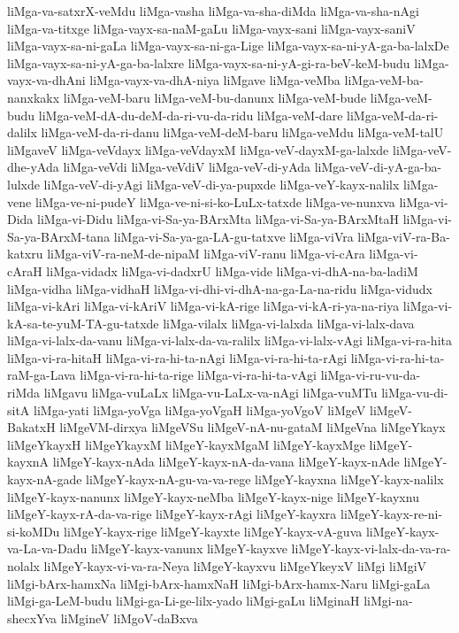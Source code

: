 {liMga-va-satxrX-veMdu
liMga-vasha
liMga-va-sha-diMda
liMga-va-sha-nAgi
liMga-va-titxge
liMga-vayx-sa-naM-gaLu
liMga-vayx-sani
liMga-vayx-saniV
liMga-vayx-sa-ni-gaLa
liMga-vayx-sa-ni-ga-Lige
liMga-vayx-sa-ni-yA-ga-ba-lalxDe
liMga-vayx-sa-ni-yA-ga-ba-lalxre
liMga-vayx-sa-ni-yA-gi-ra-beV-keM-budu
liMga-vayx-va-dhAni
liMga-vayx-va-dhA-niya
liMgave
liMga-veMba
liMga-veM-ba-nanxkakx
liMga-veM-baru
liMga-veM-bu-danunx
liMga-veM-bude
liMga-veM-budu
liMga-veM-dA-du-deM-da-ri-vu-da-ridu
liMga-veM-dare
liMga-veM-da-ri-dalilx
liMga-veM-da-ri-danu
liMga-veM-deM-baru
liMga-veMdu
liMga-veM-talU
liMgaveV
liMga-veVdayx
liMga-veVdayxM
liMga-veV-dayxM-ga-lalxde
liMga-veV-dhe-yAda
liMga-veVdi
liMga-veVdiV
liMga-veV-di-yAda
liMga-veV-di-yA-ga-ba-lulxde
liMga-veV-di-yAgi
liMga-veV-di-ya-pupxde
liMga-veY-kayx-nalilx
liMga-vene
liMga-ve-ni-pudeY
liMga-ve-ni-si-ko-LuLx-tatxde
liMga-ve-nunxva
liMga-vi-Dida
liMga-vi-Didu
liMga-vi-Sa-ya-BArxMta
liMga-vi-Sa-ya-BArxMtaH
liMga-vi-Sa-ya-BArxM-tana
liMga-vi-Sa-ya-ga-LA-gu-tatxve
liMga-viVra
liMga-viV-ra-Ba-katxru
liMga-viV-ra-neM-de-nipaM
liMga-viV-ranu
liMga-vi-cAra
liMga-vi-cAraH
liMga-vidadx
liMga-vi-dadxrU
liMga-vide
liMga-vi-dhA-na-ba-ladiM
liMga-vidha
liMga-vidhaH
liMga-vi-dhi-vi-dhA-na-ga-La-na-ridu
liMga-vidudx
liMga-vi-kAri
liMga-vi-kAriV
liMga-vi-kA-rige
liMga-vi-kA-ri-ya-na-riya
liMga-vi-kA-sa-te-yuM-TA-gu-tatxde
liMga-vilalx
liMga-vi-lalxda
liMga-vi-lalx-dava
liMga-vi-lalx-da-vanu
liMga-vi-lalx-da-va-ralilx
liMga-vi-lalx-vAgi
liMga-vi-ra-hita
liMga-vi-ra-hitaH
liMga-vi-ra-hi-ta-nAgi
liMga-vi-ra-hi-ta-rAgi
liMga-vi-ra-hi-ta-raM-ga-Lava
liMga-vi-ra-hi-ta-rige
liMga-vi-ra-hi-ta-vAgi
liMga-vi-ru-vu-da-riMda
liMgavu
liMga-vuLaLx
liMga-vu-LaLx-va-nAgi
liMga-vuMTu
liMga-vu-di-sitA
liMga-yati
liMga-yoVga
liMga-yoVgaH
liMga-yoVgoV
liMgeV
liMgeV-BakatxH
liMgeVM-dirxya
liMgeVSu
liMgeV-nA-nu-gataM
liMgeVna
liMgeYkayx
liMgeYkayxH
liMgeYkayxM
liMgeY-kayxMgaM
liMgeY-kayxMge
liMgeY-kayxnA
liMgeY-kayx-nAda
liMgeY-kayx-nA-da-vana
liMgeY-kayx-nAde
liMgeY-kayx-nA-gade
liMgeY-kayx-nA-gu-va-va-rege
liMgeY-kayxna
liMgeY-kayx-nalilx
liMgeY-kayx-nanunx
liMgeY-kayx-neMba
liMgeY-kayx-nige
liMgeY-kayxnu
liMgeY-kayx-rA-da-va-rige
liMgeY-kayx-rAgi
liMgeY-kayxra
liMgeY-kayx-re-ni-si-koMDu
liMgeY-kayx-rige
liMgeY-kayxte
liMgeY-kayx-vA-guva
liMgeY-kayx-va-La-va-Dadu
liMgeY-kayx-vanunx
liMgeY-kayxve
liMgeY-kayx-vi-lalx-da-va-ra-nolalx
liMgeY-kayx-vi-va-ra-Neya
liMgeY-kayxvu
liMgeYkeyxV
liMgi
liMgiV
liMgi-bArx-hamxNa
liMgi-bArx-hamxNaH
liMgi-bArx-hamx-Naru
liMgi-gaLa
liMgi-ga-LeM-budu
liMgi-ga-Li-ge-lilx-yado
liMgi-gaLu
liMginaH
liMgi-na-shecxYva
liMgineV
liMgoV-daBxva
}
